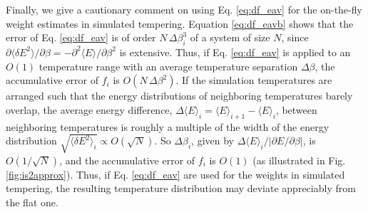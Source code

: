 \documentclass[reprint,aip,jcp,superscriptaddress]{revtex4-1}
\begin{document}
Finally, we give a cautionary comment
on using Eq. \eqref{eq:df_eav}
for the on-the-fly weight estimates
in simulated tempering\cite{park2007}.
%
Equation \eqref{eq:df_eavb} shows that
the error of Eq. \eqref{eq:df_eav}
is of order $N \, \Delta \beta_i^3$
of a system of size $N$,
since
$\partial \langle \delta E^2 \rangle / \partial \beta
= -\partial^2 \langle E \rangle / \partial \beta^2$
is extensive.
%
Thus,
if Eq. \eqref{eq:df_eav} is applied to
an $O(1)$ temperature range
with an average temperature separation $\Delta \beta$,
the accumulative error of $f_i$
is $O(N \, \Delta \beta^2)$.
%
If the simulation temperatures
are arranged
such that the energy distributions
of neighboring temperatures
barely overlap,
%
the average energy difference,
$\Delta \langle E \rangle_i = \langle E \rangle_{i+1} - \langle E \rangle_i$,
between neighboring temperatures
is roughly a multiple of the width of
the energy distribution
$\sqrt{ \langle \delta E^2 \rangle_i } \propto O(\sqrt{N})$.
%
So $\Delta \beta_i$,
given by $\Delta \langle E \rangle_i / |\partial E/\partial \beta|$,
is $O(1/\sqrt{N})$,
%
and the accumulative error
of $f_i$ is $O(1)$
(as illustrated in Fig. \ref{fig:is2approx}).
%
Thus, if Eq. \eqref{eq:df_eav}
are used for the weights
in simulated tempering\cite{park2007},
the resulting temperature distribution
may deviate appreciably
from the flat one.
%




\end{document}
